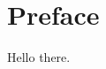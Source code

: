 \documentclass[../main.tex]{subfiles}
\begin{document}
\chapter{Preface}

Hello there.
\end{document}

